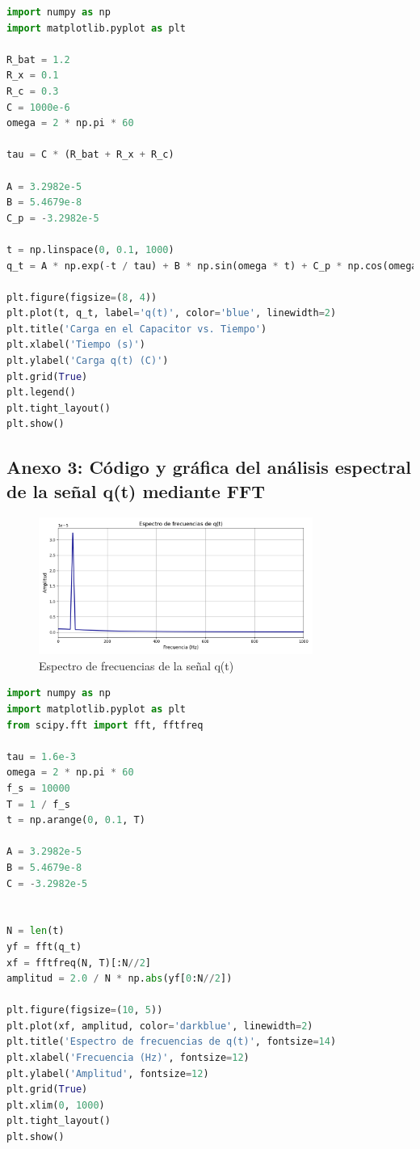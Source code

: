 \begin{lstlisting}[language=Python, caption={Código Python para simulación de carga}, label={cod:carga}, frame=single, basicstyle=\footnotesize\ttfamily]
import numpy as np
import matplotlib.pyplot as plt

R_bat = 1.2
R_x = 0.1
R_c = 0.3
C = 1000e-6
omega = 2 * np.pi * 60

tau = C * (R_bat + R_x + R_c)

A = 3.2982e-5
B = 5.4679e-8
C_p = -3.2982e-5

t = np.linspace(0, 0.1, 1000)
q_t = A * np.exp(-t / tau) + B * np.sin(omega * t) + C_p * np.cos(omega * t)

plt.figure(figsize=(8, 4))
plt.plot(t, q_t, label='q(t)', color='blue', linewidth=2)
plt.title('Carga en el Capacitor vs. Tiempo')
plt.xlabel('Tiempo (s)')
plt.ylabel('Carga q(t) (C)')
plt.grid(True)
plt.legend()
plt.tight_layout()
plt.show()
\end{lstlisting}

\newpage

\subsection*{Anexo 3: Código y gráfica del análisis espectral de la señal q(t) mediante FFT}
\begin{figure}[H]
	\centering
	\includegraphics[width=0.8\textwidth]{8.png}
	\caption{Espectro de frecuencias de la señal q(t)}
\end{figure}

\begin{lstlisting}[language=Python, caption={Código Python del análisis espectral}, label={cod:fft}, frame=single, basicstyle=\footnotesize\ttfamily]
import numpy as np
import matplotlib.pyplot as plt
from scipy.fft import fft, fftfreq

tau = 1.6e-3
omega = 2 * np.pi * 60
f_s = 10000
T = 1 / f_s
t = np.arange(0, 0.1, T)

A = 3.2982e-5
B = 5.4679e-8
C = -3.2982e-5


N = len(t)
yf = fft(q_t)
xf = fftfreq(N, T)[:N//2]
amplitud = 2.0 / N * np.abs(yf[0:N//2])

plt.figure(figsize=(10, 5))
plt.plot(xf, amplitud, color='darkblue', linewidth=2)
plt.title('Espectro de frecuencias de q(t)', fontsize=14)
plt.xlabel('Frecuencia (Hz)', fontsize=12)
plt.ylabel('Amplitud', fontsize=12)
plt.grid(True)
plt.xlim(0, 1000)
plt.tight_layout()
plt.show()
\end{lstlisting}

